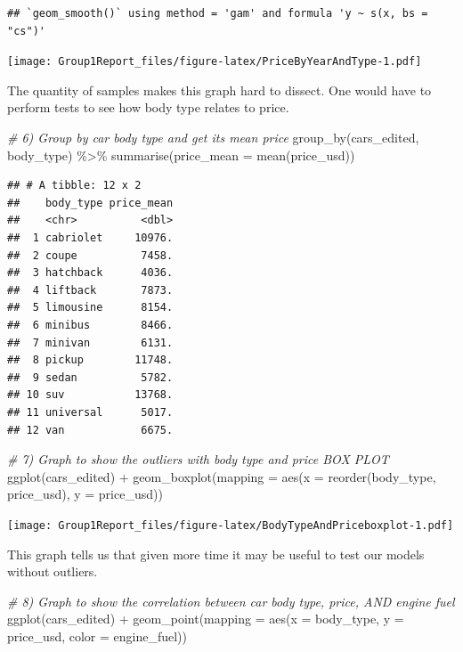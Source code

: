 \documentclass[
]{article}
\newenvironment{Shaded}{\begin{snugshade}}{\end{snugshade}}
\newcommand{\AttributeTok}[1]{\textcolor[rgb]{0.77,0.63,0.00}{#1}}
\newcommand{\CommentTok}[1]{\textcolor[rgb]{0.56,0.35,0.01}{\textit{#1}}}
\newcommand{\FunctionTok}[1]{\textcolor[rgb]{0.00,0.00,0.00}{#1}}
\newcommand{\NormalTok}[1]{#1}
\newcommand{\SpecialCharTok}[1]{\textcolor[rgb]{0.00,0.00,0.00}{#1}}
\begin{document}
\begin{verbatim}
## `geom_smooth()` using method = 'gam' and formula 'y ~ s(x, bs = "cs")'
\end{verbatim}

\texttt{[image: Group1Report\_files/figure-latex/PriceByYearAndType-1.pdf]}

The quantity of samples makes this graph hard to dissect. One would have
to perform tests to see how body type relates to price.

\begin{Shaded}
\begin{Highlighting}[]
\CommentTok{\# 6) Group by car body type and get its mean price}
\FunctionTok{group\_by}\NormalTok{(cars\_edited, body\_type) }\SpecialCharTok{\%\textgreater{}\%} \FunctionTok{summarise}\NormalTok{(}\AttributeTok{price\_mean =} \FunctionTok{mean}\NormalTok{(price\_usd))}
\end{Highlighting}
\end{Shaded}

\begin{verbatim}
## # A tibble: 12 x 2
##    body_type price_mean
##    <chr>          <dbl>
##  1 cabriolet     10976.
##  2 coupe          7458.
##  3 hatchback      4036.
##  4 liftback       7873.
##  5 limousine      8154.
##  6 minibus        8466.
##  7 minivan        6131.
##  8 pickup        11748.
##  9 sedan          5782.
## 10 suv           13768.
## 11 universal      5017.
## 12 van            6675.
\end{verbatim}

\begin{Shaded}
\begin{Highlighting}[]
\CommentTok{\# 7) Graph to show the outliers with body type and price BOX PLOT}
\FunctionTok{ggplot}\NormalTok{(cars\_edited) }\SpecialCharTok{+} \FunctionTok{geom\_boxplot}\NormalTok{(}\AttributeTok{mapping =} \FunctionTok{aes}\NormalTok{(}\AttributeTok{x =} \FunctionTok{reorder}\NormalTok{(body\_type, price\_usd), }\AttributeTok{y =}
\NormalTok{                                                   price\_usd))}
\end{Highlighting}
\end{Shaded}

\texttt{[image: Group1Report\_files/figure-latex/BodyTypeAndPriceboxplot-1.pdf]}

This graph tells us that given more time it may be useful to test our
models without outliers.

\begin{Shaded}
\begin{Highlighting}[]
\CommentTok{\# 8) Graph to show the correlation between car body type, price, AND engine fuel}
\FunctionTok{ggplot}\NormalTok{(cars\_edited) }\SpecialCharTok{+} \FunctionTok{geom\_point}\NormalTok{(}\AttributeTok{mapping =} \FunctionTok{aes}\NormalTok{(}\AttributeTok{x =}\NormalTok{ body\_type, }\AttributeTok{y =}\NormalTok{ price\_usd, }\AttributeTok{color =}\NormalTok{ engine\_fuel))}
\end{Highlighting}
\end{Shaded}
\end{document}
